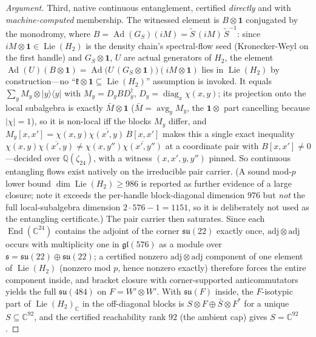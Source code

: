 \begin{proof}[Argument]
Third, native continuous entanglement, certified \emph{directly} and with \emph{machine-computed} membership. The witnessed element is $B\otimes\mathbf{1}$ conjugated by the monodromy, where $B = \operatorname{Ad}(G_S)(iM) = \tilde S\,(iM)\,\tilde S^{-1}$: since $iM\otimes\mathbf{1}\in\operatorname{Lie}(H_2)$ is the density chain's spectral-flow seed (Kronecker-Weyl on the first handle) and $G_S\otimes\mathbf{1}$, $U$ are actual generators of $H_2$, the element $\operatorname{Ad}(U)(B\otimes\mathbf{1}) = \operatorname{Ad}\!\big(U\,(G_S\otimes\mathbf{1})\big)(iM\otimes\mathbf{1})$ lies in $\operatorname{Lie}(H_2)$ by construction---no ``$\mathfrak{k}\otimes\mathbf{1}\subseteq\operatorname{Lie}(H_2)$'' assumption is invoked. It equals $\sum_y M_y\otimes\lvert y\rangle\langle y\rvert$ with $M_y = D_y B D_y^{\dagger}$, $D_y=\operatorname{diag}_x\chi(x,y)$; its projection onto the local subalgebra is exactly $\bar M\otimes\mathbf{1}$ ($\bar M=\operatorname{avg}_y M_y$, the $\mathbf{1}\otimes$ part cancelling because $\lvert\chi\rvert=1$), so it is non-local iff the blocks $M_y$ differ, and $M_y[x,x'] = \chi(x,y)\overline{\chi(x',y)}\,B[x,x']$ makes this a single exact inequality $\chi(x,y)\overline{\chi(x',y)}\neq\chi(x,y'')\overline{\chi(x',y'')}$ at a coordinate pair with $B[x,x']\neq0$---decided over $\mathbb{Q}(\zeta_{24})$, with a witness $(x,x',y,y'')$ pinned. So continuous entangling flows exist natively on the irreducible pair carrier. (A sound mod-$p$ lower bound $\dim\operatorname{Lie}(H_2)\ge 986$ is reported as further evidence of a large closure; note it exceeds the per-handle block-diagonal dimension $976$ but \emph{not} the full local-subalgebra dimension $2\cdot 576-1=1151$, so it is deliberately not used as the entangling certificate.)
The pair carrier then saturates.
Since each $\operatorname{End}(\mathbb{C}^{24})$ contains the adjoint of the corner $\mathfrak{su}(22)$ exactly once, $\mathrm{adj}\otimes\mathrm{adj}$ occurs with multiplicity one in $\mathfrak{gl}(576)$ as a module over $\mathfrak{s} = \mathfrak{su}(22)\oplus\mathfrak{su}(22)$; a certified nonzero $\mathrm{adj}\otimes\mathrm{adj}$ component of one element of $\operatorname{Lie}(H_2)$ (nonzero mod $p$, hence nonzero exactly) therefore forces the entire component inside, and bracket closure with corner-supported anticommutators yields the full $\mathfrak{su}(484)$ on $F = W'\otimes W'$.
With $\mathfrak{su}(F)$ inside, the $F$-isotypic part of ${\operatorname{Lie}(H_2)}_{\mathbb{C}}$ in the off-diagonal blocks is $S\otimes F \oplus \bar S\otimes F^*$ for a unique $S\subseteq\mathbb{C}^{92}$, and the certified reachability rank $92$ (the ambient cap) gives $S = \mathbb{C}^{92}$.

\end{proof}
